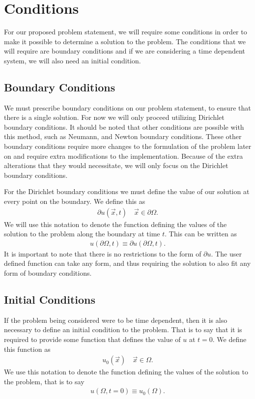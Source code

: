 \documentclass[../fem.tex]{subfile}
\begin{document}
\section{Conditions}%
\label{sec:conditions}

For our proposed problem statement, we will require some conditions in order to
make it possible to determine a solution to the problem. The conditions that we
will require are boundary conditions and if we are considering a time dependent
system, we will also need an initial condition.

\subsection{Boundary Conditions}%
\label{sub:boundary_conditions}

We must prescribe boundary conditions on our problem statement, to ensure that
there is a single solution. For now we will only proceed utilizing Dirichlet
boundary conditions. It should be noted that other conditions are possible with
this method, such as Neumann, and Newton boundary conditions. These other
boundary conditions require more changes to the formulation of the problem
later on and require extra modifications to the implementation. Because of the
extra alterations that they would necessitate, we will only focus on the
Dirichlet boundary conditions.

For the Dirichlet boundary conditions we must define the value of our solution
at every point on the boundary. We define this as
\begin{align*}
  \partial u(\vec{x},t)\quad\vec{x}\in\partial\Omega.
\end{align*}
We will use this notation to denote the function defining the values of the
solution to the problem along the boundary at time $t$. This can be written as
\begin{align*}
  u(\partial\Omega,t)\equiv\partial u(\partial\Omega,t).
\end{align*}
It is important to note that there is no restrictions to the form of $\partial
u$. The user defined function can take any form, and thus requiring the
solution to also fit any form of boundary conditions.

\subsection{Initial Conditions}%
\label{sub:initial_conditions}

If the problem being considered were to be time dependent, then it is also
necessary to define an initial condition to the problem. That is to say that it
is required to provide some function that defines the value of $u$ at $t=0$. We
define this function as
\begin{align*}
  u_0(\vec{x})\quad\vec{x}\in\Omega.
\end{align*}
We use this notation to denote the function defining the values of the
solution to the problem, that is to say
\begin{align*}
  u(\Omega,t=0)\equiv u_0(\Omega).
\end{align*}
\end{document}
